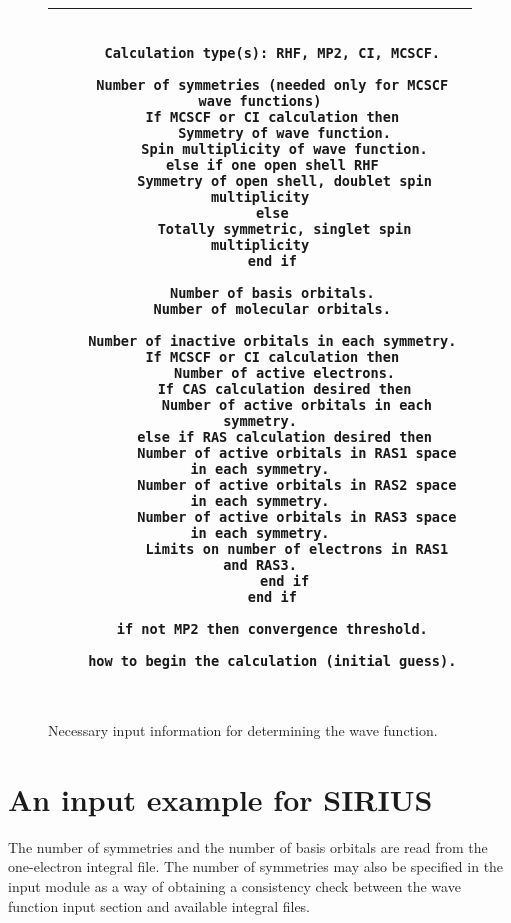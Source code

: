 \begin{figure}
    \newlength{\mpwidth}
    \settowidth{\mpwidth}{\tt M}
    \addtolength{\mpwidth}{65\mpwidth}
\begin{tabular}{|c|}
\hline
\begin{minipage}{\mpwidth}
\begin{verbatim}
 
   Calculation type(s): RHF, MP2, CI, MCSCF.
 
   Number of symmetries (needed only for MCSCF wave functions)
   If MCSCF or CI calculation then
      Symmetry of wave function.
      Spin multiplicity of wave function.
   else if one open shell RHF
      Symmetry of open shell, doublet spin multiplicity
   else
      Totally symmetric, singlet spin multiplicity
   end if
 
   Number of basis orbitals.
   Number of molecular orbitals.
 
   Number of inactive orbitals in each symmetry.
   If MCSCF or CI calculation then
      Number of active electrons.
      If CAS calculation desired then
         Number of active orbitals in each symmetry.
      else if RAS calculation desired then
         Number of active orbitals in RAS1 space in each symmetry.
         Number of active orbitals in RAS2 space in each symmetry.
         Number of active orbitals in RAS3 space in each symmetry.
         Limits on number of electrons in RAS1 and RAS3.
      end if
   end if
 
   if not MP2 then convergence threshold.
 
   how to begin the calculation (initial guess).
 
\end{verbatim}
\end{minipage} \\ \hline
\end{tabular}
\vspace{0.5cm}
\caption{Necessary input information for determining the wave
function.}\label{fig-nec.inp.} 
\end{figure}
 
 
\section{\label{sec:si-ex} An input example for SIRIUS}

\noindent
The number of symmetries and the number of basis orbitals are read from
the one-electron integral file.  The number of symmetries may also be
specified in the  input module as a way of
obtaining a consistency check between the wave function input section
and available integral files. 
 
